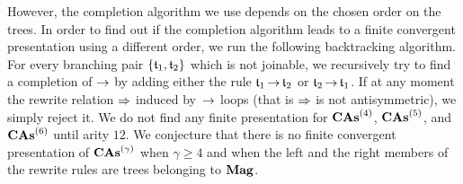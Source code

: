 However, the completion algorithm we use depends on the chosen order on
the trees. In order to find out if the completion algorithm leads to a
finite convergent presentation using a different order, we run the
following backtracking algorithm. For every branching pair
$\left\{\mathfrak{t}_1, \mathfrak{t}_2\right\}$ which is not joinable, we recursively
try to find a completion of $\operatorname{\to}$ by adding either the rule
$\mathfrak{t}_1 \operatorname{\to}  \mathfrak{t}_2$ or $\mathfrak{t}_2 \operatorname{\to}  \mathfrak{t}_1$.
If at any moment the rewrite relation $\operatorname{\Rightarrow}$ induced by~$\operatorname{\to}$
loops (that is $\operatorname{\Rightarrow}$ is not antisymmetric), we simply reject it.
We do not find any finite presentation for $\mathbf{CAs}^{\left(4\right)}$, $\mathbf{CAs}^{\left(5\right)}$, and
$\mathbf{CAs}^{\left(6\right)}$ until arity $12$. We conjecture that there is no finite
convergent presentation of $\mathbf{CAs}^{\left(\gamma\right)}$ when $\gamma \geq 4$ and when
the left and the right members of the rewrite rules are trees
belonging to $\mathbf{Mag}$.
\medbreak

